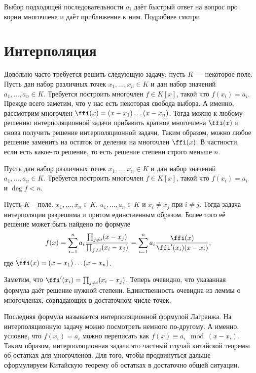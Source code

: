 Выбор подходящей последовательности $a_i$ даёт быстрый ответ на вопрос про корни многочлена и даёт приближение к ним. Подробнее смотри \cite[стр 56-61]{McNamee}



\section{Интерполяция}

Довольно часто требуется решить следующую задачу: пусть $K$ --- некоторое поле. Пусть дан набор различных точек
$x_1,\dots, x_n \in K$ и дан набор значений $a_1,\dots,a_n\in K$. Требуется построить многочлен $f\in K[x]$, такой что $f(x_i)=a_i$.
Прежде всего заметим, что у нас есть некоторая свобода выбора. А именно, рассмотрим многочлен $\ffi(x)=(x-x_1)\dots(x-x_n)$. Тогда можно к любому решению интерполяционной задачи прибавить кратное многочлена $\ffi(x)$ и снова получить решение интерполяционной задачи. Таким образом, можно любое решение заменить на остаток от деления на многочлен $\ffi(x)$. В частности, если есть какое-то решение, то есть решение степени строго меньше $n$.

 Пусть дан набор различных точек $x_1,\dots,x_n\in K$ и дан набор значений
$a_1,\dots, a_n\in K$. Требуется построить многочлен $f\in K[x]$, такой что $f(x_i)=a_i$ и $\deg f < n$.
\edfn

\thrm Пусть $K$ -- поле. $x_1,\dots,x_n \in K$, $a_1,\dots,a_n \in K$ и $x_i\neq x_j$ при $i\neq j$. Тогда задача интерполяции разрешима и притом единственным образом. Более того её решение может быть найдено по формуле
$$f(x)=\sum_{i=1}^n a_i\frac{\prod_{j\neq i}(x-x_j)}{\prod_{j\neq i } (x_i-x_j)}=\sum_{i=1}^n a_i\frac{\ffi(x)}{\ffi'(x_i)(x-x_i)},$$
где $\ffi(x)=(x-x_1)\dots(x-x_n)$.
\ethrm

\proof Заметим, что $\ffi'(x_i)=\prod_{j\neq i}(x_i-x_j)$. Теперь очевидно, что указанная формула даёт решение нужной степени. Единственность очевидна из леммы о многочленах, совпадающих в достаточном числе точек.
\endproof

Последняя формула называется интерполяционной формулой Лагранжа. На интерполяционную задачу можно посмотреть немного по-другому. А именно, условие, что $f(x_i)=a_i$ можно переписать как $f(x)\equiv a_i \mod (x-x_i)$. Таким образом, интерполяционная задача это частный случай китайской теоремы об остатках для многочленов. Для того, чтобы продвинуться дальше сформулируем Китайскую теорему об остатках в достаточно общей ситуации. 


